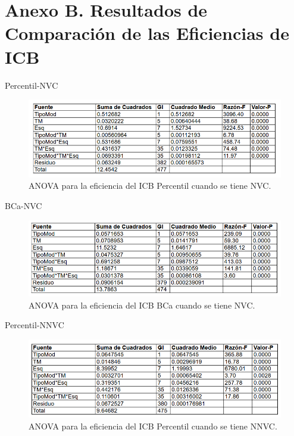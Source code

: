 \newpage
\section*{Anexo B. Resultados de Comparación de las Eficiencias de ICB}

Percentil-NVC

\begin{figure}[ht!] 
	\centering 
	\includegraphics[width=0.95\linewidth]{img/ANOVA_Efic_ICB_Perc_NVC.png} 
	\caption{ANOVA para la eficiencia del ICB Percentil cuando se tiene NVC.} 
	\label{fig:ANOVA_Efic_ICB_Perc_NVC}
\end{figure}
\FloatBarrier



BCa-NVC

\begin{figure}[ht] 
	\centering 
	\includegraphics[width=0.95\linewidth]{img/ANOVA_Efic_ICB_BCa_NVC.png} 
	\caption{ANOVA para la eficiencia del ICB BCa cuando se tiene NVC.} 
	\label{fig:ANOVA_Efic_ICB_BCa_NVC}
\end{figure}
\FloatBarrier




Percentil-NNVC

\begin{figure}[ht] 
	\centering 
	\includegraphics[width=0.95\linewidth]{img/ANOVA_Efic_ICB_Perc_NNVC.png} 
	\caption{ANOVA para la eficiencia del ICB Percentil cuando se tiene NNVC.} 
	\label{fig:ANOVA_Efic_ICB_Perc_NNVC}
\end{figure}
\FloatBarrier




